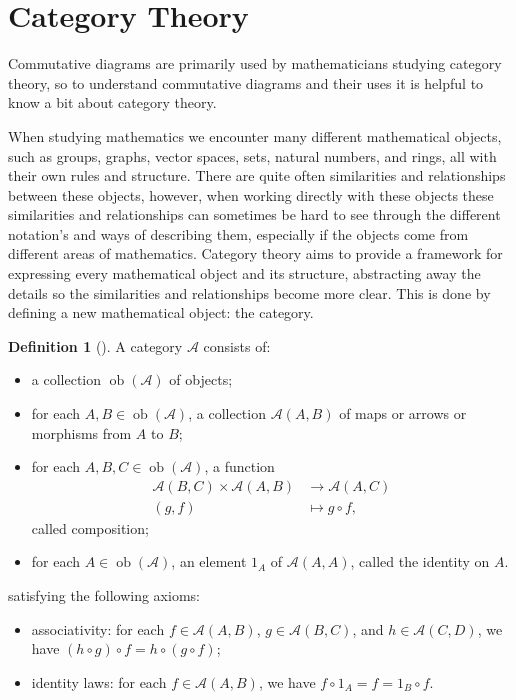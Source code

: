 \documentclass[logo,bsc,singlespacing,parskip]{infthesis}
\theoremstyle{definition}
\newtheorem{defn}[prop]{Definition}
\newcommand{\cat}[1]{\mathscr{#1}}
\newcommand{\ob}[1]{\obj(\mathscr{#1})}
\DeclareMathOperator{\obj}{ob}
\begin{document}
\section{Category Theory}\label{bkg:cat}
Commutative diagrams are primarily used by mathematicians studying category theory, so to understand commutative diagrams and their uses it is helpful to know a bit about category theory.

When studying mathematics we encounter many different mathematical objects, such as groups, graphs, vector spaces, sets, natural numbers, and rings, all with their own rules and structure. There are quite often similarities and relationships between these objects, however, when working directly with these objects these similarities and relationships can sometimes be hard to see through the different notation's and ways of describing them, especially if the objects come from different areas of mathematics. Category theory aims to provide a framework for expressing every mathematical object and its structure, abstracting away the details so the similarities and relationships become more clear. This is done by defining a new mathematical object: the category.

\begin{defn}[{\autocite[Def 1.1.1]{leinster2016basic}}]\label{def:cat}
    A category $\cat{A}$ consists of:
    \begin{itemize}
        \item a collection $\ob{A}$ of objects;
        \item for each $A, B \in \ob{A}$, a collection $\cat A(A,B)$ of maps or arrows or morphisms from $A$ to $B$;
        \item for each $A, B, C \in \ob{A}$, a function 
        \begin{align*}
            \cat{A}(B,C) \times \cat{A}(A,B) &\to \cat{A}(A,C) \\
            (g,f) &\mapsto g \circ f,
        \end{align*}
        called composition;
        \item for each $A \in \ob{A}$, an element $1_A$ of $\cat{A}(A,A)$, called the identity on $A$.
    \end{itemize}
    satisfying the following axioms:
    \begin{itemize}
        \item associativity: for each $f \in \cat{A}(A,B)$, $g \in \cat{A}(B,C)$, and $h \in \cat{A}(C,D)$, we have $(h \circ g) \circ f = h \circ (g \circ f)$;
        \item identity laws: for each $f \in \cat{A}(A,B)$, we have $f \circ 1_A = f = 1_B \circ f$.
    \end{itemize}
\end{defn}
\end{document}
